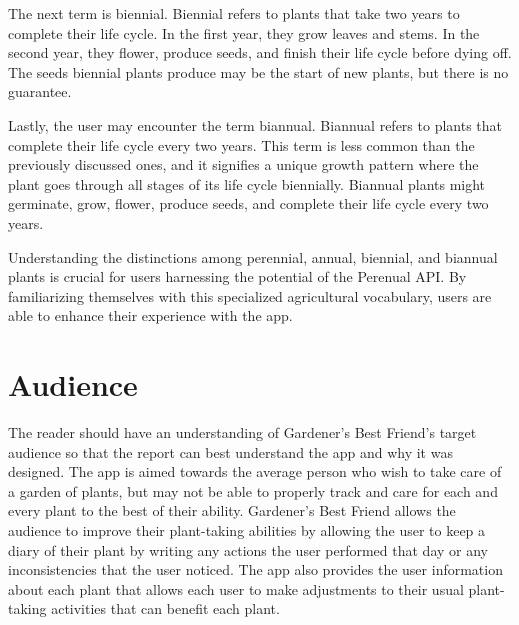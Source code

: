 \documentclass{sigchi}
\begin{document}
The next term is biennial. Biennial refers to plants that take two years to complete their life cycle. In the first year, they grow leaves and stems. In the second year, they flower, produce seeds, and finish their life cycle before dying off. The seeds biennial plants produce may be the start of new plants, but there is no guarantee.

Lastly, the user may encounter the term biannual. Biannual refers to plants that complete their life cycle every two years. This term is less common than the previously discussed ones, and it signifies a unique growth pattern where the plant goes through all stages of its life cycle biennially. Biannual plants might germinate, grow, flower, produce seeds, and complete their life cycle every two years.

Understanding the distinctions among perennial, annual, biennial, and biannual plants is crucial for users harnessing the potential of the Perenual API. By familiarizing themselves with this specialized agricultural vocabulary, users are able to enhance their experience with the app.

\section{Audience}
The reader should have an understanding of Gardener's Best Friend's target audience so that the report can best understand the app and why it was designed. The app is aimed towards the average person who wish to take care of a garden of plants, but may not be able to properly track and care for each and every plant to the best of their ability. Gardener's Best Friend allows the audience to improve their plant-taking abilities by allowing the user to keep a diary of their plant by writing any actions the user performed that day or any inconsistencies that the user noticed. The app also provides the user information about each plant that allows each user to make adjustments to their usual plant-taking activities that can benefit each plant.
\end{document}

